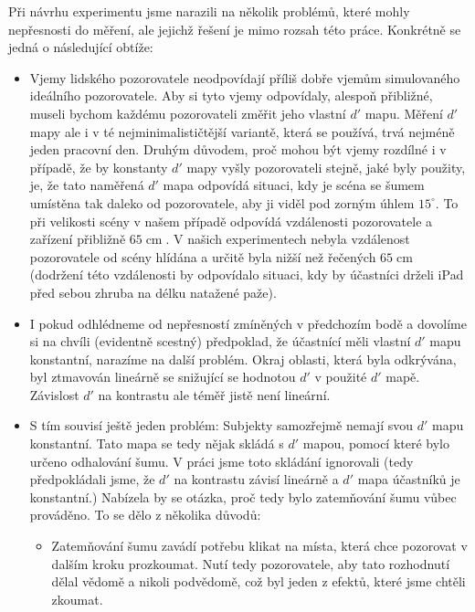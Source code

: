 Při návrhu experimentu jsme narazili na několik problémů, které mohly
nepřesnosti do měření, ale jejichž řešení je mimo rozsah této práce. Konkrétně
se jedná o následující obtíže:

\begin{itemize}

\item Vjemy lidského pozorovatele neodpovídají příliš dobře vjemům simulovaného
ideálního pozorovatele. Aby si tyto vjemy odpovídaly, alespoň přibližné, museli
bychom každému pozorovateli změřit jeho vlastní $d'$ mapu. Měření $d'$ mapy ale
i  v té nejminimalističtější variantě, která se používá, trvá nejméně jeden
pracovní den. Druhým důvodem, proč mohou být vjemy rozdílné i v případě, že by
konstanty $d'$ mapy vyšly pozorovateli stejně, jaké byly použity, je, že tato
naměřená $d'$ mapa odpovídá situaci, kdy je scéna se šumem umístěna tak daleko
od pozorovatele, aby ji viděl pod zorným úhlem $15^\circ$. To při velikosti
scény v našem případě odpovídá vzdálenosti pozorovatele a zařízení přibližně
$65 \operatorname{cm}$. V našich experimentech nebyla vzdálenost pozorovatele od
scény hlídána a určitě byla nižší než řečených $65 \operatorname{cm}$
(dodržení této vzdálenosti by odpovídalo situaci, kdy by účastníci drželi iPad
před sebou zhruba na délku natažené paže). 

\item I pokud odhlédneme od nepřesností zmíněných v předchozím bodě a dovolíme
si na chvíli (evidentně scestný) předpoklad, že účastnící měli vlastní $d'$ mapu
konstantní, narazíme na další problém. Okraj oblasti, která byla odkrývána,
byl ztmavován lineárně se snižující se hodnotou $d'$ v použité $d'$ mapě.
Závislost $d'$ na kontrastu ale téměř jistě
není lineární.

\item S tím souvisí ještě jeden problém: Subjekty samozřejmě nemají svou $d'$
mapu konstantní. Tato mapa se tedy nějak skládá s $d'$ mapou, pomocí které
bylo určeno odhalování šumu. V práci jsme toto skládání ignorovali (tedy
předpokládali jsme, že $d'$ na kontrastu závisí lineárně a $d'$ mapa účastníků
je konstantní.) Nabízela by se otázka, proč tedy bylo zatemňování šumu vůbec
prováděno. To se dělo z několika důvodů:

\begin{itemize}

\item Zatemňování šumu zavádí potřebu klikat na místa, která chce pozorovat v
dalším kroku prozkoumat. Nutí tedy pozorovatele, aby tato rozhodnutí dělal
vědomě a nikoli podvědomě, což byl jeden z efektů, které jsme chtěli zkoumat.


\end{itemize}
\end{itemize}

